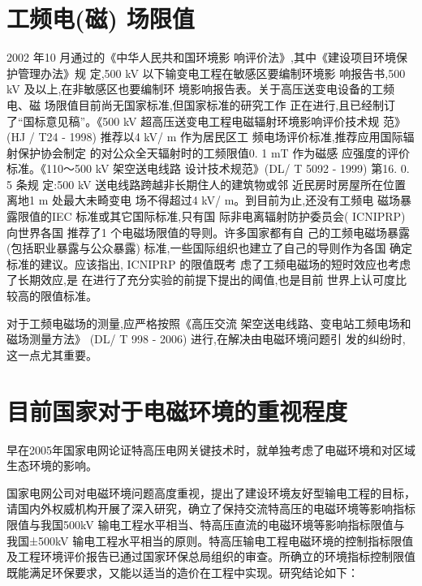 \documentclass{ctexart} %
\begin{document}
\section{工频电(磁) 场限值}

2002 年10 月通过的《中华人民共和国环境影
响评价法》,其中《建设项目环境保护管理办法》规
定,500 kV 以下输变电工程在敏感区要编制环境影
响报告书,500 kV 及以上,在非敏感区也要编制环
境影响报告表。关于高压送变电设备的工频电、磁
场限值目前尚无国家标准,但国家标准的研究工作
正在进行,且已经制订了“国标意见稿”。《500 kV
超高压送变电工程电磁辐射环境影响评价技术规
范》(HJ / T24 - 1998) 推荐以4 kV/ m 作为居民区工
频电场评价标准,推荐应用国际辐射保护协会制定
的对公众全天辐射时的工频限值0. 1 mT 作为磁感
应强度的评价标准。《110～500 kV 架空送电线路
设计技术规范》(DL/ T 5092 - 1999) 第16. 0. 5 条规
定:500 kV 送电线路跨越非长期住人的建筑物或邻
近民房时房屋所在位置离地1 m 处最大未畸变电
场不得超过4 kV/ m。到目前为止,还没有工频电
磁场暴露限值的IEC 标准或其它国际标准,只有国
际非电离辐射防护委员会( ICNIPRP) 向世界各国
推荐了1 个电磁场限值的导则。许多国家都有自
己的工频电磁场暴露(包括职业暴露与公众暴露)
标准,一些国际组织也建立了自己的导则作为各国
确定标准的建议。应该指出, ICNIPRP 的限值既考
虑了工频电磁场的短时效应也考虑了长期效应,是
在进行了充分实验的前提下提出的阈值,也是目前
世界上认可度比较高的限值标准。

对于工频电磁场的测量,应严格按照《高压交流
架空送电线路、变电站工频电场和磁场测量方法》
(DL/ T 998 - 2006) 进行,在解决由电磁环境问题引
发的纠纷时,这一点尤其重要。

\section{目前国家对于电磁环境的重视程度}
早在2005年国家电网论证特高压电网关键技术时，就单独考虑了电磁环境和对区域生态环境的影响。

国家电网公司对电磁环境问题高度重视，提出了建设环境友好型输电工程的目标，请国内外权威机构开展了深入研究，确立了保持交流特高压的电磁环境等影响指标限值与我国500kV 输电工程水平相当、特高压直流的电磁环境等影响指标限值与我国±500kV 输电工程水平相当的原则。特高压输电工程电磁环境的控制指标限值及工程环境评价报告已通过国家环保总局组织的审查。所确立的环境指标控制限值既能满足环保要求，又能以适当的造价在工程中实现。研究结论如下\cite{舒印彪20062005}：
\end{document}
